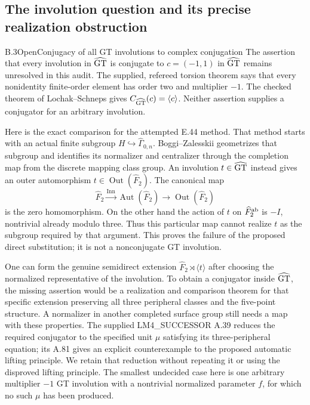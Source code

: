 \subsection{The involution question and its precise realization obstruction}

\begin{result}{B.3}{Open}{Conjugacy of all GT involutions to complex conjugation}
The assertion that every involution in $\widehat{\mathrm{GT}}$ is conjugate to
$c=(-1,1)$ in $\widehat{\mathrm{GT}}$ remains unresolved in this audit.
The supplied, refereed torsion theorem says that every
nonidentity finite-order element has order two and multiplier
$-1$. The checked theorem of Lochak--Schneps gives
$C_{\widehat{\mathrm{GT}}}(c)=\langle c\rangle$. Neither assertion supplies
a conjugator for an arbitrary involution.
\end{result}

Here is the exact comparison for the attempted E.44 method.
That method starts with an actual finite subgroup
$H\hookrightarrow\widehat\Gamma_{0,n}$. Boggi--Zalesskii
geometrizes that subgroup and identifies its normalizer and
centralizer through the completion map from the discrete
mapping class group. An involution $t\in\widehat{\mathrm{GT}}$ instead
gives an outer automorphism
$t\in\operatorname{Out}(\widehat F_2)$.
The canonical map
\[
 \widehat F_2\xrightarrow{\operatorname{Inn}}
 \operatorname{Aut}(\widehat F_2)
 \longrightarrow\operatorname{Out}(\widehat F_2)
\]
is the zero homomorphism. On the other hand the action of
$t$ on $\widehat F_2^{\rm ab}$ is $-I$, nontrivial already
modulo three. Thus this particular map cannot realize $t$
as the subgroup required by that argument. This proves
the failure of the proposed direct substitution; it is
not a nonconjugate GT involution.

One can form the genuine semidirect extension
$\widehat F_2\rtimes\langle t\rangle$ after choosing the
normalized representative of the involution. To obtain
a conjugator inside $\widehat{\mathrm{GT}}$, the missing assertion would
be a realization and comparison theorem for that specific
extension preserving all three peripheral classes and
the five-point structure. A normalizer in another
completed surface group still needs a map with these
properties. The supplied LM4\_SUCCESSOR A.39 reduces
the required conjugator to the specified unit $\mu$
satisfying its three-peripheral equation; its A.81 gives
an explicit counterexample to the proposed automatic
lifting principle. We retain that reduction without
repeating it or using the disproved lifting principle.
The smallest undecided case here is one arbitrary
multiplier $-1$ GT involution with a nontrivial normalized
parameter $f$, for which no such $\mu$ has been produced.

